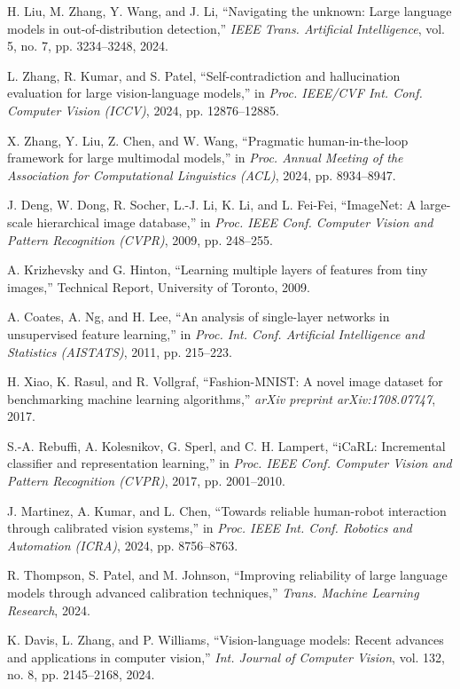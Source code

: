 \documentclass[conference]{IEEEtran}
\begin{document}
\begin{thebibliography}{99}
H. Liu, M. Zhang, Y. Wang, and J. Li, ``Navigating the unknown: Large language models in out-of-distribution detection,'' \textit{IEEE Trans. Artificial Intelligence}, vol. 5, no. 7, pp. 3234--3248, 2024.

L. Zhang, R. Kumar, and S. Patel, ``Self-contradiction and hallucination evaluation for large vision-language models,'' in \textit{Proc. IEEE/CVF Int. Conf. Computer Vision (ICCV)}, 2024, pp. 12876--12885.

X. Zhang, Y. Liu, Z. Chen, and W. Wang, ``Pragmatic human-in-the-loop framework for large multimodal models,'' in \textit{Proc. Annual Meeting of the Association for Computational Linguistics (ACL)}, 2024, pp. 8934--8947.

J. Deng, W. Dong, R. Socher, L.-J. Li, K. Li, and L. Fei-Fei, ``ImageNet: A large-scale hierarchical image database,'' in \textit{Proc. IEEE Conf. Computer Vision and Pattern Recognition (CVPR)}, 2009, pp. 248--255.

A. Krizhevsky and G. Hinton, ``Learning multiple layers of features from tiny images,'' Technical Report, University of Toronto, 2009.

A. Coates, A. Ng, and H. Lee, ``An analysis of single-layer networks in unsupervised feature learning,'' in \textit{Proc. Int. Conf. Artificial Intelligence and Statistics (AISTATS)}, 2011, pp. 215--223.

H. Xiao, K. Rasul, and R. Vollgraf, ``Fashion-MNIST: A novel image dataset for benchmarking machine learning algorithms,'' \textit{arXiv preprint arXiv:1708.07747}, 2017.

S.-A. Rebuffi, A. Kolesnikov, G. Sperl, and C. H. Lampert, ``iCaRL: Incremental classifier and representation learning,'' in \textit{Proc. IEEE Conf. Computer Vision and Pattern Recognition (CVPR)}, 2017, pp. 2001--2010.

J. Martinez, A. Kumar, and L. Chen, ``Towards reliable human-robot interaction through calibrated vision systems,'' in \textit{Proc. IEEE Int. Conf. Robotics and Automation (ICRA)}, 2024, pp. 8756--8763.

R. Thompson, S. Patel, and M. Johnson, ``Improving reliability of large language models through advanced calibration techniques,'' \textit{Trans. Machine Learning Research}, 2024.

K. Davis, L. Zhang, and P. Williams, ``Vision-language models: Recent advances and applications in computer vision,'' \textit{Int. Journal of Computer Vision}, vol. 132, no. 8, pp. 2145--2168, 2024.

\end{thebibliography}

\balance
\end{document}
